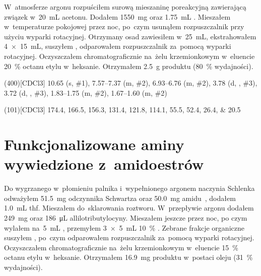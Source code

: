 W~atmosferze argonu rozpuściłem surową mieszaninę poreakcyjną zawierającą związek
   w~\SI{20}{\mL} acetonu.
Dodałem \SI{1550}{\milli\gram}  oraz \SI{1.75}{\mL} .
Mieszałem w~temperaturze pokojowej przez noc, po~czym usunąłem rozpuszczalnik przy użyciu
  wyparki rotacyjnej.
Otrzymany osad zawiesiłem w~\SI{25}{\mL},
  ekstrahowałem \SI[product-units = single]{4 x 15}{\mL},
  suszyłem , odparowałem rozpuszczalnik za~pomocą wyparki rotacyjnej.
Oczyszczałem chromatograficznie na~żelu krzemionkowym w~eluencie \SI{20}{\percent} octanu
  etylu w~heksanie.
Otrzymałem \SI{2.5}{\gram} produktu (\SI{80}{\percent} wydajności).

\begin{fullexp}
  \NMR(400)[CDCl3] \num{10.65} (s, \#{1}), \numrange{7.57}{7.37} (m, \#{2}), \numrange{6.93}{6.76} (m, \#{2}), \num{3.78} (d, , \#{3}), \num{3.72} (d, , \#{3}), \numrange{1.83}{1.75} (m, \#{2}), \numrange{1.67}{1.60} (m, \#{2})\par\noindent
  (101)[CDCl3] \numlist{174.4; 166.5; 156.3; 131.4; 121.8; 114.1; 55.5; 52.4; 26.4; 20.5}
\end{fullexp}

\section{Funkcjonalizowane aminy wywiedzione z~amidoestrów}\label{experimental:amidoester-products}
Do wygrzanego w~płomieniu palnika i~wypełnionego argonem naczynia Schlenka odważyłem
  \SI{51.5}{\mg} odczynnika Schwartza oraz \SI{50.0}{\mg} amidu~,
  dodałem \SI{1.0}{\mL} \gls{thf}.
Mieszałem do~sklarowania roztworu.
W~przepływie argonu dodałem \SI{249}{\mg}  oraz \SI{186}{\uL} allilotributylocyny.
Mieszałem jeszcze przez noc, po czym wylałem na~\SI{5}{\mL} ,
  przemyłem \SI[product-units = single]{3 x 5}{\mL} \SI{10}{\percent} .
Zebrane frakcje organiczne suszyłem , po~czym odparowałem rozpuszczalnik za~pomocą
  wyparki rotacyjnej.
Oczyszczałem chromatograficznie na~żelu krzemionkowym w~eluencie \SI{15}{\percent} octanu
  etylu w~heksanie.
Otrzymałem \SI{16.9}{\mg} produktu w~postaci oleju (\SI{31}{\percent} wydajności).

